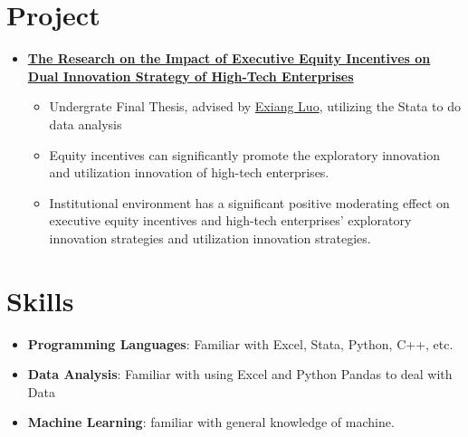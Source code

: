 \documentclass{resume}
\newcommand{\en}[1]{#1}
\newcommand{\zh}[1]{}
\begin{document}
\section{\en{Project}\zh{项目}}
\begin{itemize}[parsep=0.25ex]
      \item \en{\href{}{\textbf{The Research on the Impact of Executive
                              Equity Incentives on Dual Innovation Strategy of High-Tech Enterprises}}}
            \zh{\textbf{高管股权激励对高新技术企业
                        双元创新的影响研究}}
            \vspace{2 mm}
            \begin{itemize}
                  \item \en{Undergrate Final Thesis, advised by \href{https://bs.usst.edu.cn/2020/0630/c10586a226783/page.htm}{Exiang Luo}, utilizing the Stata to do data analysis}
                        \vspace{2 mm}
                  \item \en{Equity incentives can significantly promote the exploratory innovation and utilization innovation of high-tech enterprises.}
                        \vspace{2 mm}

                  \item \en{Institutional environment has a significant positive moderating effect on executive equity incentives and high-tech enterprises' exploratory innovation strategies and utilization innovation strategies.}
                        \vspace{2 mm}

            \end{itemize}
\end{itemize}

\section{\en{Skills}\zh{技能}}
\begin{itemize}[parsep=0.25ex]
      \item \en{\textbf{Programming Languages}:
                  Familiar with Excel, Stata, Python, C++, etc.}

            \zh{\textbf{编程语言}:
                  熟悉Excel, Stata, Python, C++等。}
            \vspace{2 mm}

      \item \en{\textbf{Data Analysis}: Familiar with using Excel and Python Pandas to deal with Data}
            \vspace{2 mm}

      \item \en{\textbf{Machine Learning}:
                  familiar with general knowledge of machine.}
            \zh{\textbf{机器学习}:
                  熟悉经典机器学习算法。}
            \vspace{2 mm}

\end{itemize}
\end{document}
